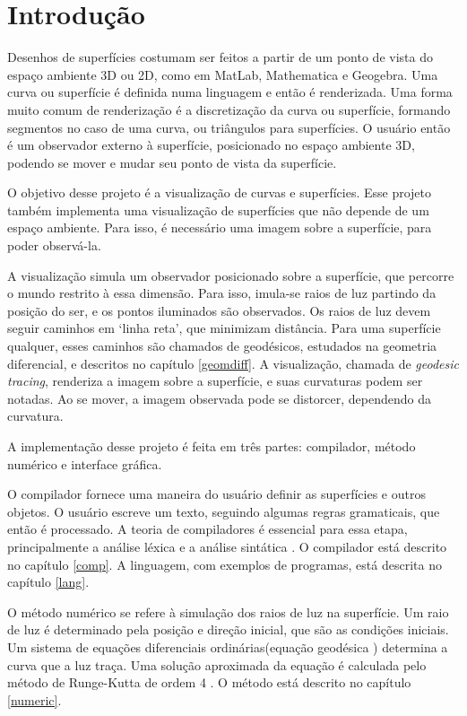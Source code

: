 \chapter{Introdução}
Desenhos de superfícies costumam ser feitos a partir de um ponto de vista do
espaço ambiente 3D ou 2D, como em MatLab, Mathematica e Geogebra.
Uma curva ou superfície é definida numa linguagem e então é renderizada.
Uma forma muito comum de renderização é a discretização da curva ou superfície,
formando segmentos no caso de uma curva, ou triângulos para superfícies.
O usuário então é um observador externo à superfície, posicionado no espaço ambiente
3D, podendo se mover e mudar seu ponto de vista da superfície.

O objetivo desse projeto é a visualização de curvas e superfícies.
Esse projeto também implementa uma visualização de superfícies que não depende de um espaço ambiente.
Para isso, é necessário uma imagem sobre a superfície, para poder observá-la.

A visualização simula um observador posicionado sobre a superfície, que percorre o mundo
restrito à essa dimensão.
Para isso, imula-se raios de luz partindo da posição do ser, e os pontos iluminados são observados.
Os raios de luz devem seguir caminhos em `linha reta', que minimizam distância.
Para uma superfície qualquer, esses caminhos são chamados de geodésicos,
estudados na geometria diferencial, e descritos no capítulo \ref{geomdiff}.
A visualização, chamada de \textit{geodesic tracing}, renderiza a imagem sobre a superfície,
e suas curvaturas podem ser notadas. Ao se mover, a imagem observada pode se distorcer,
dependendo da curvatura.

A implementação desse projeto é feita em três partes:
compilador, método numérico e interface gráfica.

O compilador fornece uma maneira do usuário definir as superfícies e outros objetos.
O usuário escreve um texto, seguindo algumas regras gramaticais, que então é processado.
A teoria de compiladores é essencial para essa etapa,
principalmente a análise léxica e a análise sintática \cite{Dragon:1}.
O compilador está descrito no capítulo \ref{comp}.
A linguagem, com exemplos de programas, está descrita no capítulo \ref{lang}.

O método numérico se refere à simulação dos raios de luz na superfície.
Um raio de luz é determinado pela posição e direção inicial, que são as condições iniciais.
Um sistema de equações diferenciais ordinárias(equação geodésica \cite{GeomDiff:1})
determina a curva que a luz traça.
Uma solução aproximada da equação é calculada pelo método de Runge-Kutta de ordem 4 \cite{Anal:1}.
O método está descrito no capítulo \ref{numeric}.

